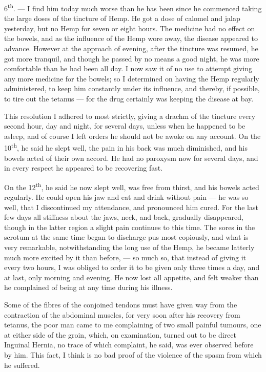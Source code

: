 \documentclass[a4paper, 11pt, oneside, polutonikogreek, english]{article}
\begin{document}
6\textsuperscript{th}. --- I find him today much worse than he has been since he commenced taking the large doses of the tincture of Hemp. He got a dose of calomel and jalap yesterday, but no Hemp for seven or eight hours. The medicine had no effect on the bowels, and as the influence of the Hemp wore away, the disease appeared to advance. However at the approach of evening, after the tincture was resumed, he got more tranquil, and though he passed by no means a good night, he was more comfortable than he had been all day. I now saw it of no use to attempt giving any more medicine for the bowels; so I determined on having the Hemp regularly administered, to keep him constantly under its influence, and thereby, if possible, to tire out the tetanus --- for the drug certainly was keeping the disease at bay.

This resolution I adhered to most strictly, giving a drachm of the tincture every second hour, day and night, for several days, unless when he happened to be asleep, and of course I left orders he should not be awoke on any account. On the 10\textsuperscript{th}, he said he slept well, the pain in his back was much diminished, and his bowels acted of their own accord. He had no paroxysm now for several days, and in every respect he appeared to be recovering fast.

On the 12\textsuperscript{th}, he said he now slept well, was free from thirst, and his bowels acted regularly. He could open his jaw and eat and drink without pain --- he was so well, that I discontinued my attendance, and pronounced him cured. For the last few days all stiffness about the jaws, neck, and back, gradually disappeared, though in the latter region a slight pain continues to this time. The sores in the scrotum at the same time began to discharge pus most copiously, and what is very remarkable, notwithstanding the long use of the Hemp, he became latterly much more excited by it than before, --- so much so, that instead of giving it every two hours, I was obliged to order it to be given only three times a day, and at last, only morning and evening. He now lost all appetite, and felt weaker than he complained of being at any time during his illness.

Some of the fibres of the conjoined tendons must have given way from the contraction of the abdominal muscles, for very soon after his recovery from tetanus, the poor man came to me complaining of two small painful tumours, one at either side of the groin, which, on examination, turned out to be direct Inguinal Hernia, no trace of which complaint, he said, was ever observed before by him. This fact, I think is no bad proof of the violence of the spasm from which he suffered.
\end{document}
